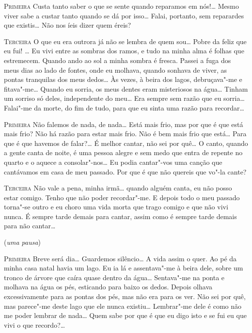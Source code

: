 \textsc{Primeira} Custa tanto saber o que se sente
quando reparamos em nós!\ldots{}
Mesmo viver sabe a custar tanto quando se dá por
isso\ldots{} Falai,
portanto, sem reparardes que existis\ldots{} 
Não nos íeis dizer quem éreis?

\textsc{Terceira} O que eu era outrora já
não se lembra de quem sou\ldots{} Pobre da
feliz que eu fui! \ldots{} Eu vivi entre as
sombras dos ramos, e tudo na
minha alma é folhas que estremecem.
Quando ando ao sol a minha sombra é
fresca. Passei a fuga dos meus dias ao
lado de fontes, onde eu molhava,
quando sonhava de viver, as pontas 
tranquilas dos meus dedos\ldots{} Às
vezes, à beira dos lagos, debruçava"-me 
e fitava"-me\ldots{} Quando eu
sorria, os meus dentes eram misteriosos
na água\ldots{} Tinham um sorriso só
deles, independente do meu\ldots{} 
Era sempre sem razão que eu sorria\ldots{}
Falai"-me da morte, do fim de tudo, para
que eu sinta uma razão para recordar\ldots{}

\textsc{Primeira} Não falemos de nada,
de nada\ldots{} Está mais frio, mas por que é
que está mais frio? Não há razão para estar
mais frio. Não é bem mais
frio que está\ldots{} Para que é que 
havemos de falar?\ldots{} É melhor cantar,
não sei por quê\ldots{} O canto, quando a
gente canta de noite, é uma pessoa
alegre e sem medo que entra de repente no quarto e o aquece a
consolar"-nos\ldots{} Eu podia cantar"-vos
uma canção que cantávamos em
casa de meu passado. Por que é que não quereis que vo"-la cante?

\textsc{Terceira} Não vale a pena, minha
irmã\ldots{} quando alguém canta, eu não
posso estar comigo. Tenho que não poder
recordar"-me. E depois todo o
meu passado torna"-se outro e eu 
choro uma vida morta que trago comigo
e que não vivi nunca. É sempre tarde demais para cantar, assim como é
sempre tarde demais para não cantar\ldots{}

\hfill(\textit{uma pausa}) 

\textsc{Primeira} Breve será dia\ldots{} 
Guardemos silêncio\ldots{} A vida assim o quer.
Ao pé da minha casa natal havia um lago.
Eu ia lá e assentava"-me à
beira dele, sobre um tronco de árvore que 
caíra quase dentro da água\ldots{}
Sentava"-me na ponta e molhava na água os pés,
esticando para baixo os
dedos. Depois olhava excessivamente para as
pontas dos pés, mas não era
para os ver. Não sei por quê, mas parece"-me
deste lago que ele nunca
existiu\ldots{} Lembrar"-me dele é como não
me poder lembrar de nada\ldots{}
Quem sabe por que é que eu digo isto e se fui eu que vivi o que
recordo?\ldots{}

